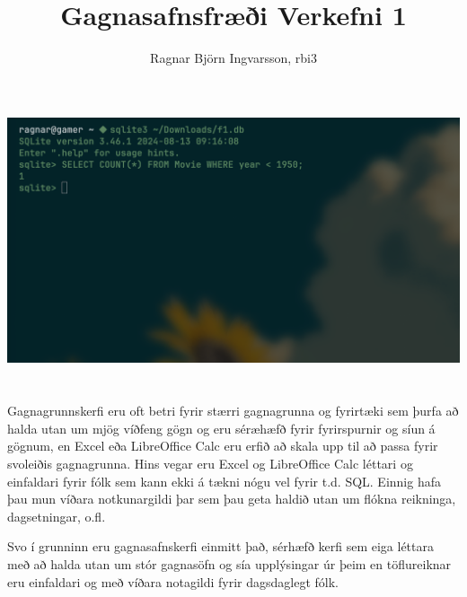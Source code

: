\documentclass{article}
\title{Gagnasafnsfræði Verkefni 1}
\author{Ragnar Björn Ingvarsson, rbi3}
\begin{document}
	
	\maketitle
	
	\section{}
	
	\includegraphics[scale=0.275]{sql.png}

	\section{}

	Gagnagrunnskerfi eru oft betri 
	fyrir stærri gagnagrunna og fyrirtæki sem þurfa að halda utan um mjög 
	víðfeng gögn og eru séræhæfð fyrir fyrirspurnir og síun á gögnum, en 
	Excel eða LibreOffice Calc eru erfið að skala upp til að passa 
	fyrir svoleiðis gagnagrunna. Hins vegar eru Excel og LibreOffice Calc 
	léttari og einfaldari fyrir fólk sem kann ekki á tækni nógu vel fyrir 
	t.d. SQL. Einnig hafa þau mun víðara notkunargildi þar sem þau geta 
	haldið utan um flókna reikninga, dagsetningar, o.fl.

	Svo í grunninn eru gagnasafnskerfi einmitt það, sérhæfð kerfi sem eiga 
	léttara með að halda utan um stór gagnasöfn og sía upplýsingar úr þeim 
	en töflureiknar eru einfaldari og með víðara notagildi 
	fyrir dagsdaglegt fólk.
\end{document}
